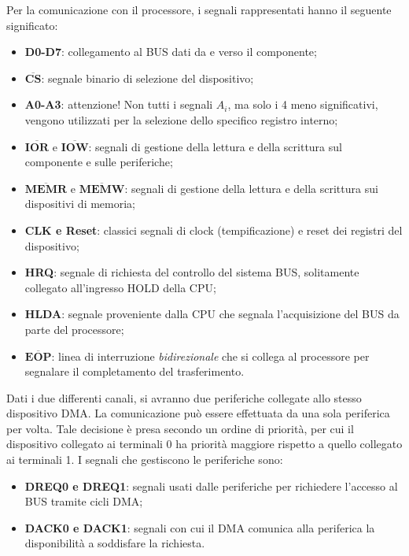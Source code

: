 Per la comunicazione con il processore, i segnali rappresentati hanno il seguente significato:
\begin{itemize}
    \item \textbf{D0-D7}: collegamento al BUS dati da e verso il componente;
    \item $\overline{\mathbf{CS}}$: segnale binario di selezione del dispositivo;
    \item \textbf{A0-A3}: attenzione! Non tutti i segnali $A_i$, ma solo i 4 meno significativi, vengono utilizzati per la selezione dello specifico registro interno;
    \item $\overline{\mathbf{IOR}}$ e $\overline{\mathbf{IOW}}$: segnali di gestione della lettura e della scrittura sul componente e sulle periferiche;
    \item $\overline{\mathbf{MEMR}}$ e $\overline{\mathbf{MEMW}}$: segnali di gestione della lettura e della scrittura sui dispositivi di memoria;
    \item \textbf{CLK e Reset}: classici segnali di clock (tempificazione) e reset dei registri del dispositivo;
    \item \textbf{HRQ}: segnale di richiesta del controllo del sistema BUS, solitamente collegato all'ingresso HOLD della CPU;
    \item \textbf{HLDA}: segnale proveniente dalla CPU che segnala l'acquisizione del BUS da parte del processore;
    \item $\overline{\mathbf{EOP}}$: linea di interruzione \textit{bidirezionale} che si collega al processore per segnalare il completamento del trasferimento.
\end{itemize}

Dati i due differenti canali, si avranno due periferiche collegate allo stesso dispositivo DMA. La comunicazione può essere effettuata da una sola periferica per volta. Tale decisione è presa secondo un ordine di priorità, per cui il dispositivo collegato ai terminali 0 ha priorità maggiore rispetto a quello collegato ai terminali 1. I segnali che gestiscono le periferiche sono:

\begin{itemize}
    \item \textbf{DREQ0 e DREQ1}: segnali usati dalle periferiche per richiedere l'accesso al BUS tramite cicli DMA;
    \item \textbf{DACK0 e DACK1}: segnali con cui il DMA comunica alla periferica la disponibilità a soddisfare la richiesta.
\end{itemize}

